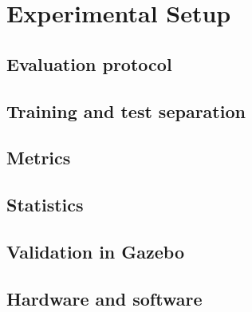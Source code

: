 \chapter{Experimental Setup}
\label{ch:setup}


\section{Evaluation protocol}
\label{sec:protocol}

\section{Training and test separation}
\label{sec:splits}

\section{Metrics}
\label{sec:metrics}

\section{Statistics}
\label{sec:statistics}

\section{Validation in Gazebo}
\label{sec:gazebo-setup}

\section{Hardware and software}
\label{sec:hardware}
